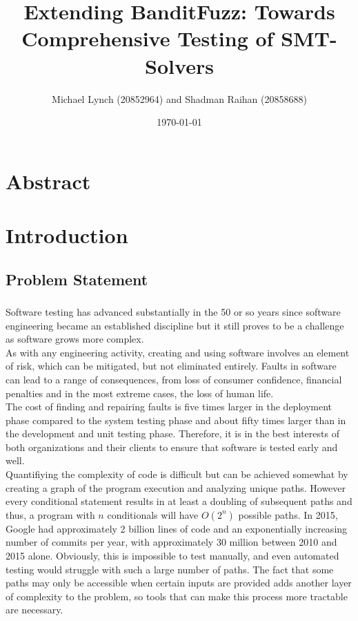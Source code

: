 \documentclass[article,11pt]{article}
\author{Michael Lynch (20852964) and Shadman Raihan (20858688)}
\date{\today}
\title{Extending BanditFuzz: Towards Comprehensive Testing of SMT-Solvers}
\begin{document}
\maketitle

\section*{Abstract}
\label{sec:org04f7447}
\section*{Introduction}
\label{sec:orgdd6f161}
\subsection*{Problem Statement}
\label{sec:org26dc543}
\subsubsection*{}
\label{sec:org282eabb}
Software testing has advanced substantially in the 50 or so years since software engineering became an established discipline but it still proves to be a challenge as software grows more complex.\\
As with any engineering activity, creating and using software involves an element of risk, which can be mitigated, but not eliminated entirely. Faults in software can lead to a range of consequences, from loss of consumer confidence, financial penalties and in the most extreme cases, the loss of human life.\\
The cost of finding and repairing faults is five times larger\cite{bk:amman} in the deployment phase compared to the system testing phase and about fifty times larger\cite{bk:amman} than in the development and unit testing phase. Therefore, it is in the best interests of both organizations and their clients to ensure that software is tested early and well.\\
Quantifiying the complexity of code is difficult but can be achieved somewhat by creating a graph of the program execution and analyzing unique paths\cite{bk:amman}. However every conditional statement results in at least a doubling of subsequent paths and thus, a program with \(n\) conditionals will have \(O(2^n)\) possible paths. In 2015, Google had approximately 2 billion lines of code\cite{vid:googlecode} and an exponentially increasing number of commits per year, with approximately 30 million between 2010 and 2015 alone\cite{vid:googlecode}. Obviously, this is impossible to test manually, and even automated testing would struggle with such a large number of paths. The fact that some paths may only be accessible when certain inputs are provided adds another layer of complexity to the problem, so tools that can make this process more tractable are necessary.\\
\end{document}
